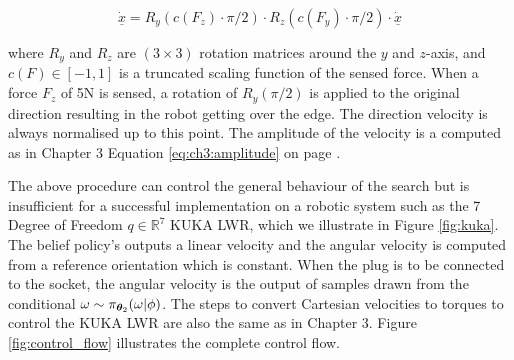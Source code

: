 \begin{equation}
  \underline{\dot{x}} = R_y(c(F_z) \cdot \pi/2) \cdot R_z(c(F_y) \cdot \pi/2) \cdot \underline{\dot{x}} \label{eq:modulation}
\end{equation}

where $R_y$ and $R_z$ are $(3 \times 3)$ rotation matrices around the $y$ and $z$-axis, and $c(F) \in [-1,1]$ is a truncated scaling function of the sensed 
force.  When a force $F_z$ of 5N is sensed, a rotation of $R_y(\pi/2)$ is applied to the original direction resulting in the robot
getting over the edge. The direction velocity is always normalised up to this point. The amplitude of the velocity is a computed 
as in Chapter 3 Equation \ref{eq:ch3:amplitude} on page \pageref{eq:ch3:amplitude}. 

The above procedure can control the general behaviour of the search but is insufficient for a successful implementation on a robotic system 
such as the 7 Degree of Freedom $q\in\mathbb{R}^7$ KUKA LWR, which we illustrate in Figure \ref{fig:kuka}. 
The belief policy's outputs a linear velocity and the angular velocity is computed from a reference orientation which is constant. 
When the plug is to be connected to the socket, the angular velocity is the output of samples drawn from the conditional 
$\omega \sim \pi_{\boldsymbol{\theta}_2}(\omega|\phi)$. The steps to convert Cartesian velocities to 
torques to control the KUKA LWR are also the same as in Chapter 3. Figure \ref{fig:control_flow} illustrates the complete control flow.



